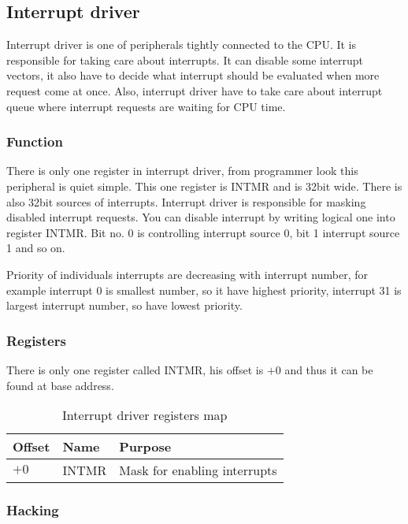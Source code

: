 \subsection{Interrupt driver}

Interrupt driver is one of peripherals tightly connected to the CPU. It is
responsible for taking care about interrupts. It can disable some interrupt
vectors, it also have to decide what interrupt should be evaluated when more
request come at once. Also, interrupt driver have to take care about interrupt
queue where interrupt requests are waiting for CPU time.

\subsubsection{Function}

There is only one register in interrupt driver, from programmer look this
peripheral is quiet simple. This one register is INTMR and is 32bit wide. There
is also 32bit sources of interrupts. Interrupt driver is responsible for
masking disabled interrupt requests. You can disable interrupt by writing
logical one into register INTMR. Bit no. 0 is controlling interrupt source 0,
bit 1 interrupt source 1 and so on.

Priority of individuals interrupts are decreasing with interrupt number, for
example interrupt 0 is smallest number, so it have highest priority, interrupt
31 is largest interrupt number, so have lowest priority.

\subsubsection{Registers}

There is only one register called INTMR, his offset is $+0$ and thus it can be
found at base address.

\begin{table}[h]
    \centering
    \begin{tabular}{|l|l|l|}
        \hline
        \textbf{Offset} & \textbf{Name} & \textbf{Purpose}             \\ \hline
        $+0$            & INTMR         & Mask for enabling interrupts \\ \hline
    \end{tabular}
    \caption{Interrupt driver registers map}
    \label{tab:int_driver_reg_map}
\end{table}

\subsubsection{Hacking}

